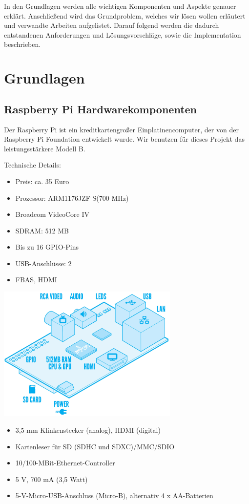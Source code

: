 \documentclass[12pt]{article}
\begin{document}
In den Grundlagen werden alle wichtigen Komponenten und Aspekte genauer erklärt. Anschließend wird das Grundproblem, welches wir lösen wollen erläutert und verwandte Arbeiten aufgelistet. 
Darauf folgend werden die dadurch entstandenen Anforderungen und Lösungsvorschläge, sowie die Implementation beschrieben.

\section{Grundlagen}


\subsection{Raspberry Pi Hardwarekomponenten}

Der Raspberry Pi ist ein kreditkartengroßer Einplatinencomputer, der von der Raspberry Pi Foundation entwickelt wurde.
Wir benutzen für dieses Projekt das leistungsstärkere Modell B.
\parbox{7,8cm}{
Technische Details: \cite{Amazon}
\begin{itemize}
\item Preis: ca. 35 Euro
\item Prozessor: ARM1176JZF-S(700 MHz)
\item Broadcom VideoCore IV
\item SDRAM: 512 MB
\item Bis zu 16 GPIO-Pins
\item USB-Anschlüsse: 2
\item FBAS, HDMI
\end{itemize}
}
\parbox{5cm}{
\includegraphics[width=9cm]{Raspi.jpg}
}
\begin{itemize}
\item 3,5-mm-Klinkenstecker (analog), HDMI (digital)
\item Kartenleser für SD (SDHC und SDXC)/MMC/SDIO
\item 10/100-MBit-Ethernet-Controller 
\item 5 V, 700 mA (3,5 Watt)
\item 5-V-Micro-USB-Anschluss (Micro-B), alternativ 4 x AA-Batterien
\end{itemize}
\end{document}
